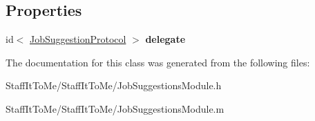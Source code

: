 \subsection*{\-Properties}
\begin{DoxyCompactItemize}
\item 
\hypertarget{interface_job_suggestions_module_a5bcab345ef0fc8e59c10251778de4ed5}{
id$<$ \hyperlink{protocol_job_suggestion_protocol-p}{\-Job\-Suggestion\-Protocol} $>$ {\bfseries delegate}}
\label{interface_job_suggestions_module_a5bcab345ef0fc8e59c10251778de4ed5}

\end{DoxyCompactItemize}


\-The documentation for this class was generated from the following files\-:\begin{DoxyCompactItemize}
\item 
\-Staff\-It\-To\-Me/\-Staff\-It\-To\-Me/\-Job\-Suggestions\-Module.\-h\item 
\-Staff\-It\-To\-Me/\-Staff\-It\-To\-Me/\-Job\-Suggestions\-Module.\-m\end{DoxyCompactItemize}
